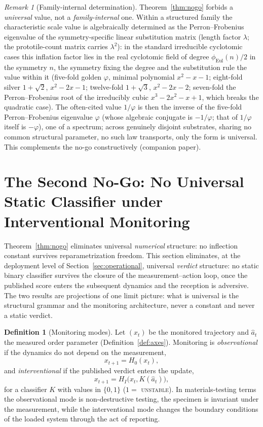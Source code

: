 \documentclass[11pt]{article}
\theoremstyle{plain}
\theoremstyle{definition}
\newtheorem{definition}[theorem]{Definition}
\theoremstyle{remark}
\newtheorem{remark}[theorem]{Remark}
\begin{document}
\begin{remark}[Family-internal determination]\label{rem:pisot}
Theorem~\ref{thm:nogo} forbids a \emph{universal} value, not a \emph{family-internal} one. Within a structured family the characteristic scale value is algebraically determined as the Perron--Frobenius eigenvalue of the symmetry-specific linear substitution matrix (length factor $\lambda$; the prototile-count matrix carries $\lambda^2$): in the standard irreducible cyclotomic cases this inflation factor lies in the real cyclotomic field of degree $\phi_{\mathrm{Eul}}(n)/2$ in the symmetry $n$, the symmetry fixing the degree and the substitution rule the value within it (five-fold golden $\varphi$, minimal polynomial $x^2-x-1$; eight-fold silver $1+\sqrt2$, $x^2-2x-1$; twelve-fold $1+\sqrt3$, $x^2-2x-2$; seven-fold the Perron--Frobenius root of the irreducibly cubic $x^3-2x^2-x+1$, which breaks the quadratic case). The often-cited value $1/\varphi$ is then the inverse of the five-fold Perron--Frobenius eigenvalue $\varphi$ (whose algebraic conjugate is $-1/\varphi$; that of $1/\varphi$ itself is $-\varphi$), one of a spectrum; across genuinely disjoint substrates, sharing no common structural parameter, no such law transports, only the form is universal. This complements the no-go constructively (companion paper).
\end{remark}

\section[The Second No-Go: No Static Classifier]{The Second No-Go: No Universal Static Classifier under Interventional Monitoring}\label{sec:nogo2}

Theorem~\ref{thm:nogo} eliminates universal \emph{numerical} structure: no inflection constant survives reparametrization freedom. This section eliminates, at the deployment level of Section~\ref{sec:operational}, universal \emph{verdict} structure: no static binary classifier survives the closure of the measurement--action loop, once the published score enters the subsequent dynamics and the reception is adversive. The two results are projections of one limit picture: what is universal is the structural grammar and the monitoring architecture, never a constant and never a static verdict.

\begin{definition}[Monitoring modes]\label{def:modes}
Let $(x_t)$ be the monitored trajectory and $\hat a_t$ the measured order parameter (Definition~\ref{def:axes}). Monitoring is \emph{observational} if the dynamics do not depend on the measurement,
\[
x_{t+1}=H_0(x_t),
\]
and \emph{interventional} if the published verdict enters the update,
\[
x_{t+1}=H_I\big(x_t,K(\hat a_t)\big),
\]
for a classifier $K$ with values in $\{0,1\}$ ($1=$ \textsc{unstable}). In materials-testing terms the observational mode is non-destructive testing, the specimen is invariant under the measurement, while the interventional mode changes the boundary conditions of the loaded system through the act of reporting.
\end{definition}
\end{document}
